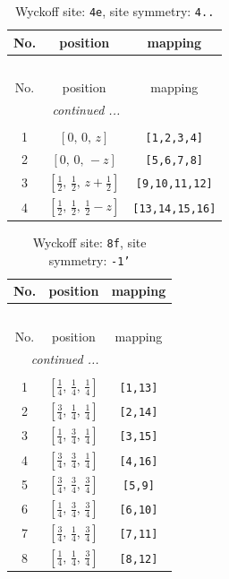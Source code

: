 \documentclass[fleqn,8pt]{jsarticle}
\begin{document}
\renewcommand{\arraystretch}{1.2}
\begin{longtable}{ccc}
\caption{Wyckoff site: {\tt 4e}, site symmetry: {\tt 4..}}
 \\
 \hline \hline
No. & position & mapping \\ \hline \endfirsthead

\multicolumn{2}{l}{\tablename\ \thetable{}} \\
 \hline \hline
No. & position & mapping \\ \hline \endhead

 \hline \hline
\multicolumn{2}{r}{\footnotesize\it continued ...} \\ \endfoot

 \hline \hline
\multicolumn{2}{r}{} \\ \endlastfoot

1 & $\left[ 0,\, 0,\, z \right]$ & {\tt [1,2,3,4]} \\ \hline
2 & $\left[ 0,\, 0,\, - z \right]$ & {\tt [5,6,7,8]} \\ \hline
3 & $\left[ \frac{1}{2},\, \frac{1}{2},\, z + \frac{1}{2} \right]$ & {\tt [9,10,11,12]} \\ \hline
4 & $\left[ \frac{1}{2},\, \frac{1}{2},\, \frac{1}{2} - z \right]$ & {\tt [13,14,15,16]} \\
\end{longtable}
\renewcommand{\arraystretch}{1.2}
\begin{longtable}{ccc}
\caption{Wyckoff site: {\tt 8f}, site symmetry: {\tt -1'}}
 \\
 \hline \hline
No. & position & mapping \\ \hline \endfirsthead

\multicolumn{2}{l}{\tablename\ \thetable{}} \\
 \hline \hline
No. & position & mapping \\ \hline \endhead

 \hline \hline
\multicolumn{2}{r}{\footnotesize\it continued ...} \\ \endfoot

 \hline \hline
\multicolumn{2}{r}{} \\ \endlastfoot

1 & $\left[ \frac{1}{4},\, \frac{1}{4},\, \frac{1}{4} \right]$ & {\tt [1,13]} \\ \hline
2 & $\left[ \frac{3}{4},\, \frac{1}{4},\, \frac{1}{4} \right]$ & {\tt [2,14]} \\ \hline
3 & $\left[ \frac{1}{4},\, \frac{3}{4},\, \frac{1}{4} \right]$ & {\tt [3,15]} \\ \hline
4 & $\left[ \frac{3}{4},\, \frac{3}{4},\, \frac{1}{4} \right]$ & {\tt [4,16]} \\ \hline
5 & $\left[ \frac{3}{4},\, \frac{3}{4},\, \frac{3}{4} \right]$ & {\tt [5,9]} \\ \hline
6 & $\left[ \frac{1}{4},\, \frac{3}{4},\, \frac{3}{4} \right]$ & {\tt [6,10]} \\ \hline
7 & $\left[ \frac{3}{4},\, \frac{1}{4},\, \frac{3}{4} \right]$ & {\tt [7,11]} \\ \hline
8 & $\left[ \frac{1}{4},\, \frac{1}{4},\, \frac{3}{4} \right]$ & {\tt [8,12]} \\
\end{longtable}
\end{document}
